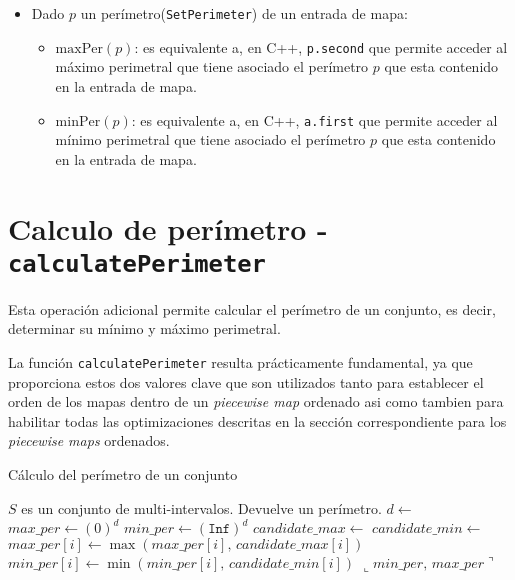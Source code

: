 \begin{itemize}
    \item Dado $p$ un perímetro(\texttt{SetPerimeter}) de un entrada de mapa:
    \begin{itemize}
        \item $\mathrm{maxPer}(p)$: es equivalente a, en C++, \texttt{p.second} que permite acceder al máximo perimetral que tiene asociado el perímetro $p$ que esta contenido en la entrada de mapa.
        \item $\mathrm{minPer}(p)$: es equivalente a, en C++, \texttt{a.first} que permite acceder al mínimo perimetral que tiene asociado el perímetro $p$ que esta contenido en la entrada de mapa.
    \end{itemize}

\end{itemize}




\section*{Calculo de perímetro - \texttt{calculatePerimeter}}

Esta operación adicional permite calcular el perímetro de un conjunto, es decir, determinar su mínimo y máximo perimetral.

La función \texttt{calculatePerimeter} resulta prácticamente fundamental, ya que proporciona estos dos valores clave que son utilizados tanto para establecer el orden de los mapas dentro de un \textit{piecewise map} ordenado asi como tambien para habilitar todas las optimizaciones descritas en la sección correspondiente para los \textit{piecewise maps} ordenados.


\begin{algorithm}
\caption{Cálculo del perímetro de un conjunto}
\label{alg:calculatePerimeter}
\begin{algorithmic}[1]
\Require $S$ es un conjunto de multi-intervalos.
\Ensure Devuelve un perímetro.
    \State $d \gets$ 
    \State $max\_per \gets (0)^d$ 
    \State $min\_per \gets (\texttt{Inf})^d$ 
        \State $candidate\_max \gets$ 
        \State $candidate\_min \gets$ 
            \State $max\_per[i] \gets \max(max\_per[i],\,candidate\_max[i])$
            \State $min\_per[i] \gets \min(min\_per[i],\,candidate\_min[i])$
        \EndFor
    \EndFor
    \State \Return $\llcorner\mathit{min\_per},\,\mathit{max\_per}\urcorner$ 
\EndFunction
\end{algorithmic}
\end{algorithm}

